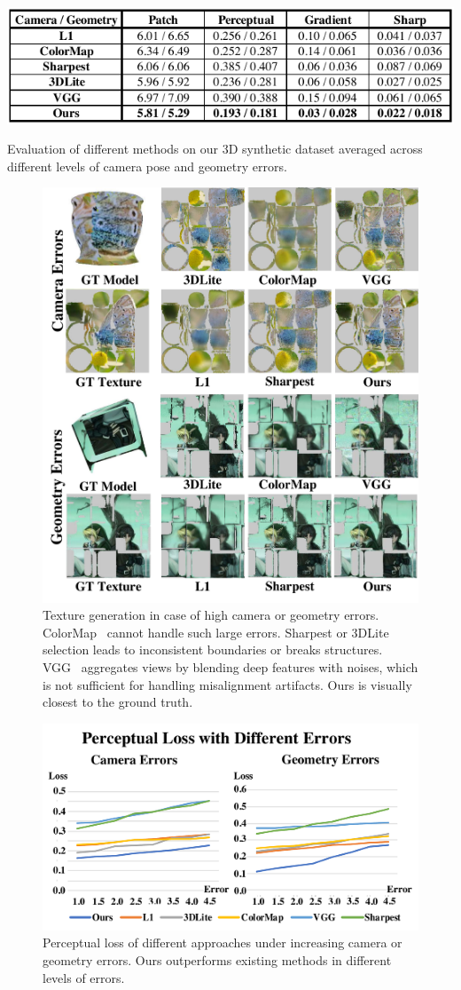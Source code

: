 \begin{table}
    \centering
    \includegraphics[width=0.8\linewidth]{texturegen/figures/synthetic-table.pdf}
    \caption{Evaluation of different methods on our 3D synthetic dataset averaged across different levels of camera pose and geometry errors.}
    \label{tab:toptim-cam-err}
\end{table}
\begin{figure}
    \centering
    \includegraphics[width=0.6\linewidth]{texturegen/figures/synth-results.pdf}
    \caption{Texture generation in case of high camera or geometry errors. ColorMap~\cite{zhou2014color} cannot handle such large errors. Sharpest or 3DLite~\cite{huang20173dlite} selection leads to inconsistent boundaries or breaks structures. VGG~\cite{johnson2016perceptual} aggregates views by blending deep features with noises, which is not sufficient for handling misalignment artifacts. Ours is visually closest to the ground truth.}
    \label{fig:toptim-pose-visual}
\end{figure}
\begin{figure}
    \centering
    \includegraphics[width=0.6\linewidth]{texturegen/figures/chart.pdf}
    \caption{Perceptual loss of different approaches under increasing camera or geometry errors. Ours outperforms existing methods in different levels of errors.}
    \label{fig:toptim-pose-chart}
\end{figure}
